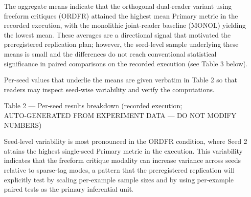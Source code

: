 \documentclass{article}
\begin{document}
The aggregate means indicate that the orthogonal dual‑reader variant using freeform critiques (ORDFR) attained the highest mean Primary metric in the recorded execution, with the monolithic joint‑reader baseline (MONOL) yielding the lowest mean. These averages are a directional signal that motivated the preregistered replication plan; however, the seed‑level sample underlying these means is small and the differences do not reach conventional statistical significance in paired comparisons on the recorded execution (see Table 3 below).

Per‑seed values that underlie the means are given verbatim in Table 2 so that readers may inspect seed‑wise variability and verify the computations.

Table 2 --- Per‑seed results breakdown (recorded execution; AUTO‑GENERATED FROM EXPERIMENT DATA --- DO NOT MODIFY NUMBERS)

\begin{table}[ht]
\centering
\caption{Performance comparison of different methods on Seed 0, Seed 1, Seed 2, Mean}
\label{tab:3}
\end{table}

Seed‑level variability is most pronounced in the ORDFR condition, where Seed 2 attains the highest single‑seed Primary metric in the execution. This variability indicates that the freeform critique modality can increase variance across seeds relative to sparse‑tag modes, a pattern that the preregistered replication will explicitly test by scaling per‑example sample sizes and by using per‑example paired tests as the primary inferential unit.
\end{document}
